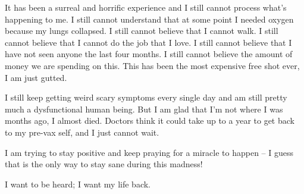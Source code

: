 {It has been a surreal and horrific experience and I still cannot process what’s
happening to me. I still cannot understand that at some point I needed oxygen
because my lungs collapsed. I still cannot believe that I cannot walk. I still
cannot believe that I cannot do the job that I love. I still cannot believe that
I have not seen anyone the last four months. I still cannot believe the amount
of money we are spending on this. This has been the most expensive free shot
ever, I am just gutted.

I still keep getting weird scary symptoms every single day and am still pretty
much a dysfunctional human being. But I am glad that I’m not where I was months
ago, I almost died. Doctors think it could take up to a year to get back to my
pre-vax self, and I just cannot wait.

I am trying to stay positive and keep praying for a miracle to happen – I guess
that is the only way to stay sane during this madness!

I want to be heard; I want my life back.

}
